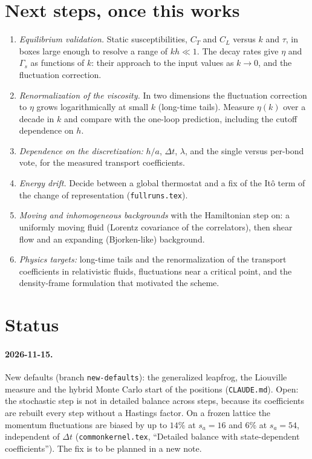 \documentclass[11pt,aps,preprint,nofootinbib,superscriptaddress,tightenlines]{revtex4-2}
\let\oldparagraph\paragraph
\renewcommand{\paragraph}{\par\bigskip\oldparagraph}
\begin{document}
\section{Next steps, once this works}
\label{sec:next}

\begin{enumerate}
\item \emph{Equilibrium validation.}  Static susceptibilities, $C_T$ and $C_L$
  versus $k$ and $\tau$, in boxes large enough to resolve a range of $kh\ll1$.
  The decay rates give $\eta$ and $\Gamma_s$ as functions of $k$: their approach to
  the input values as $k\to0$, and the fluctuation correction.
\item \emph{Renormalization of the viscosity.}  In two dimensions the
  fluctuation correction to $\eta$ grows logarithmically at small $k$ (long-time
  tails).  Measure $\eta(k)$ over a decade in $k$ and compare with the
  one-loop prediction, including the cutoff dependence on $h$.
\item \emph{Dependence on the discretization:} $h/a$, $\Delta t$, $\lambda$, and the
  single versus per-bond vote, for the measured transport coefficients.
\item \emph{Energy drift.}  Decide between a global thermostat and a fix of
  the It\^o term of the change of representation (\texttt{fullruns.tex}).
\item \emph{Moving and inhomogeneous backgrounds} with the Hamiltonian step on:
  a uniformly moving fluid (Lorentz covariance of the correlators), then
  shear flow and an expanding (Bjorken-like) background.
\item \emph{Physics targets:} long-time tails and the renormalization of the
  transport coefficients in relativistic fluids, fluctuations near a critical
  point, and the density-frame formulation that motivated the scheme.
\end{enumerate}

\section{Status}
\label{sec:status}

\paragraph{2026-11-15.}  New defaults (branch \texttt{new-defaults}): the generalized leapfrog, the Liouville measure and the
hybrid Monte Carlo start of the positions (\texttt{CLAUDE.md}).  Open: the stochastic step is not in detailed balance across
steps, because its coefficients are rebuilt every step without a Hastings factor.  On a frozen lattice the momentum
fluctuations are biased by up to $14\%$ at $s_a=16$ and $6\%$ at $s_a=54$, independent of $\Delta t$
(\texttt{commonkernel.tex}, ``Detailed balance with state-dependent coefficients'').  The fix is to be planned in a new note.
\end{document}

